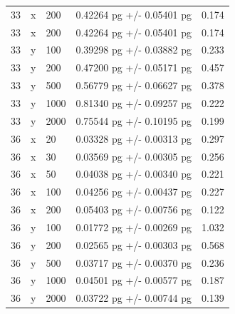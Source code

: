 \documentclass[12pt]{article}
\begin{document}
\begin{longtable}{lllll}
33        & x        & 200  & 0.42264 pg +/- 0.05401 pg    & 0.174                  \\
33        & x        & 200  & 0.42264 pg +/- 0.05401 pg    & 0.174                  \\
33        & y        & 100  & 0.39298 pg +/- 0.03882 pg    & 0.233                  \\
33        & y        & 200  & 0.47200 pg +/- 0.05171 pg    & 0.457                  \\
33        & y        & 500  & 0.56779 pg +/- 0.06627 pg    & 0.378                  \\
33        & y        & 1000 & 0.81340 pg +/- 0.09257 pg    & 0.222                  \\
33        & y        & 2000 & 0.75544 pg +/- 0.10195 pg    & 0.199                  \\
36        & x        & 20   & 0.03328 pg +/- 0.00313 pg    & 0.297                  \\
36        & x        & 30   & 0.03569 pg +/- 0.00305 pg    & 0.256                  \\
36        & x        & 50   & 0.04038 pg +/- 0.00340 pg    & 0.221                  \\
36        & x        & 100  & 0.04256 pg +/- 0.00437 pg    & 0.227                  \\
36        & x        & 200  & 0.05403 pg +/- 0.00756 pg    & 0.122                  \\
36        & y        & 100  & 0.01772 pg +/- 0.00269 pg    & 1.032                  \\
36        & y        & 200  & 0.02565 pg +/- 0.00303 pg    & 0.568                  \\
36        & y        & 500  & 0.03717 pg +/- 0.00370 pg    & 0.236                  \\
36        & y        & 1000 & 0.04501 pg +/- 0.00577 pg    & 0.187                  \\
36        & y        & 2000 & 0.03722 pg +/- 0.00744 pg    & 0.139                  \\
\end{longtable}






\vskip 0.2in

\end{document}
